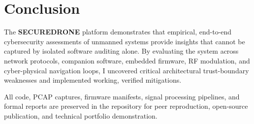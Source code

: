 \documentclass[11pt,a4paper]{article}
\begin{document}
\section{Conclusion}
The \textbf{SECUREDRONE} platform demonstrates that empirical, end-to-end cybersecurity assessments of unmanned systems provide insights that cannot be captured by isolated software auditing alone. By evaluating the system across network protocols, companion software, embedded firmware, RF modulation, and cyber-physical navigation loops, I uncovered critical architectural trust-boundary weaknesses and implemented working, verified mitigations. 

All code, PCAP captures, firmware manifests, signal processing pipelines, and formal reports are preserved in the repository for peer reproduction, open-source publication, and technical portfolio demonstration.
\end{document}
